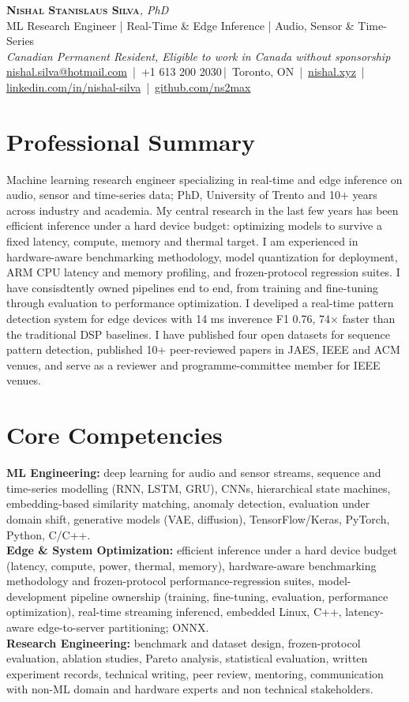 \documentclass[11pt]{article}
\makeatletter
\newcommand{\cvName}{Nishal Stanislaus Silva}
\newcommand{\cvEmail}{nishal.silva@hotmail.com}
\newcommand{\cvPhone}{+1 613 200 2030}
\newcommand{\cvCity}{Toronto, ON}
\newcommand{\cvSite}{https://nishal.xyz}
\newcommand{\cvLinkedIn}{https://www.linkedin.com/in/nishal-silva}
\newcommand{\cvGitHub}{https://github.com/ns2max}
\newcommand{\cvStatus}{Canadian Permanent Resident, Eligible to work in Canada without sponsorship}
\newcommand{\cvTagline}{ML Research Engineer | Real-Time \& Edge Inference | Audio, Sensor \& Time-Series}
\makeatother
\begin{document}
\pagestyle{empty}
\begin{center}
    {\LARGE \scshape \textbf{\cvName}}{\large \textit{, PhD}}\\[1pt]
    {\small \cvTagline}\\[1pt]
    {\footnotesize\textit{\cvStatus}}\\[1pt]
    {\small
    \href{mailto:\cvEmail}{\cvEmail} \,|\, \cvPhone \,|\, \cvCity
    \,|\, \href{\cvSite}{nishal.xyz} \,|\, \href{\cvLinkedIn}{linkedin.com/in/nishal-silva}
    \,|\, \href{\cvGitHub}{github.com/ns2max}}
\end{center}

\section*{Professional Summary}

Machine learning research engineer specializing in real-time and edge inference on audio, sensor and time-series data; PhD, University of Trento and 10+ years across industry and academia. My central research in the last few years has been efficient inference under a hard device budget: optimizing models to survive a fixed latency, compute, memory and thermal target. I am experienced in hardware-aware benchmarking methodology, model quantization for deployment, ARM CPU latency and memory profiling, and frozen-protocol regression suites. I have consisdtently owned pipelines end to end, from training and fine-tuning through evaluation to performance optimization. I develiped a real-time pattern detection system for edge devices with 14 ms  inverence F1 0.76, 74$\times$ faster than the traditional DSP baselines. I have published four open datasets for sequence pattern detection, published 10+ peer-reviewed papers in JAES, IEEE and ACM venues, and serve as a reviewer and programme-committee member for IEEE venues.

\section*{Core Competencies}

\textbf{ML Engineering:} deep learning for audio and sensor streams, sequence and time-series modelling (RNN, LSTM, GRU), CNNs, hierarchical state machines, embedding-based similarity matching, anomaly detection, evaluation under domain shift, generative models (VAE, diffusion), TensorFlow/Keras, PyTorch, Python, C/C++.\\
\textbf{Edge \& System Optimization:} efficient inference under a hard device budget (latency, compute, power, thermal, memory), hardware-aware benchmarking methodology and frozen-protocol performance-regression suites, model-development pipeline ownership (training, fine-tuning, evaluation, performance optimization), real-time streaming inferencd, embedded Linux, C++, latency-aware edge-to-server partitioning; ONNX.\\
\textbf{Research Engineering:} benchmark and dataset design, frozen-protocol evaluation, ablation studies, Pareto analysis, statistical evaluation, written experiment records, technical writing, peer review, mentoring, communication with non-ML domain and hardware experts and non technical stakeholders.
\end{document}
